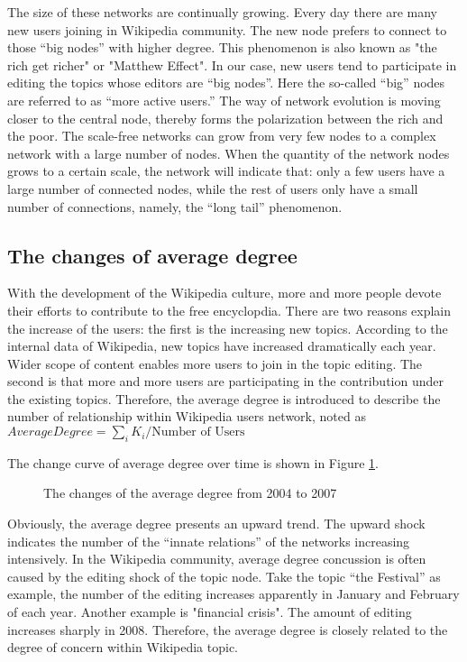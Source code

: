 \documentclass{elsarticle}
\begin{document}
The size of these networks are continually growing. Every day there
are many new users joining in Wikipedia
community.  
The new node prefers to connect to those
“big nodes” with higher degree. This phenomenon is also known as "the
rich get richer" or "Matthew Effect". In our case, new users tend to participate in editing
the topics whose editors are “big nodes”. Here
the so-called “big” nodes are referred to as “more active users.” The way of network evolution
is moving closer to the central node, thereby forms the polarization
between the rich and the poor. The scale-free networks can grow from
very few nodes to a complex network with a large number of nodes.  When the
quantity of the network nodes grows to a certain scale, the network
will indicate that: only a few users have a large number of connected
nodes, while the rest of  users only have a small number of
connections, namely, the “long tail” phenomenon. 


\subsection{The changes of average degree}
\label{sec:chang-aver-degr}

With the development of the Wikipedia culture, more and more people devote
their efforts to contribute to the free encyclopdia.  There are two
reasons explain the increase of the users: the first
is the increasing new topics. According to the internal data of
Wikipedia, new topics have increased dramatically each year.
Wider scope of content enables more users to join in the topic editing. The
second is that more and more users are participating in the
contribution under the existing topics. Therefore, the average degree
is introduced to describe the number of relationship within Wikipedia users
network, noted as $AverageDegree = \sum_iK_i/\text{Number of Users}$

The change curve of average degree over time is shown in Figure \ref{fig:average-degree}. 
\begin{figure}[htpb]
  \centering
  \scalebox{0.3}{\texttt{[image: 03]}}
  \caption{The changes of the average degree from 2004 to 2007}
  \label{fig:average-degree}
\end{figure}
Obviously, the average degree presents an upward trend. The upward shock  indicates the number of the “innate
relations” of the  networks increasing intensively. In the Wikipedia
community, average degree concussion is often caused by the editing shock of
the topic node. Take the topic “the Festival” as example, the number
of the editing increases apparently in January and February of each
year. Another example is "financial crisis". The amount of editing  increases sharply in 2008. Therefore, the average degree is closely related to the degree of concern within Wikipedia topic.
\end{document}
